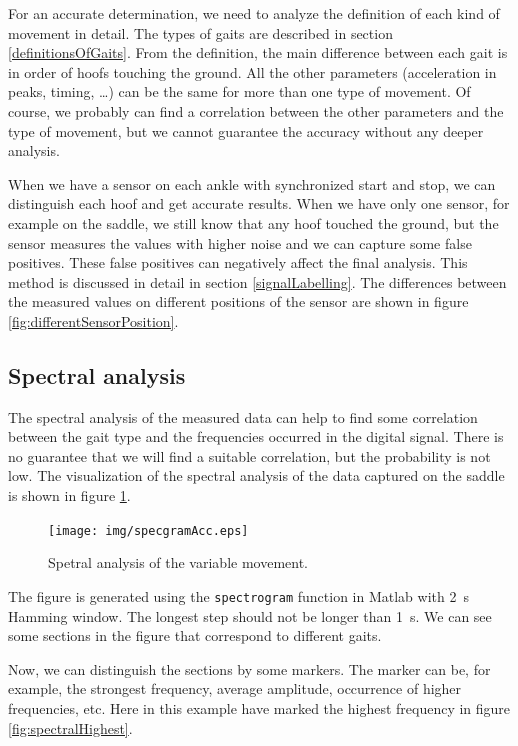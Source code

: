 For an accurate determination, we need to analyze the definition of each kind of movement in detail. The types of gaits are described in section \ref{definitionsOfGaits}. From the definition, the main difference between each gait is in order of hoofs touching the ground. All the other parameters (acceleration in peaks, timing, \dots) can be the same for more than one type of movement. Of course, we probably can find a correlation between the other parameters and the type of movement, but we cannot guarantee the accuracy without any deeper analysis.

When we have a sensor on each ankle with synchronized start and stop, we can distinguish each hoof and get accurate results. When we have only one sensor, for example on the saddle, we still know that any hoof touched the ground, but the sensor measures the values with higher noise and we can capture some false positives. These false positives can negatively affect the final analysis. This method is discussed in detail in section \ref{signalLabelling}. The differences between the measured values on different positions of the sensor are shown in figure \ref{fig:differentSensorPosition}.

\subsection{Spectral analysis}
\label{spectralAnalysis}
The spectral analysis of the measured data can help to find some correlation between the gait type and the frequencies occurred in the digital signal. There is no guarantee that we will find a suitable correlation, but the probability is not low. The visualization of the spectral analysis of the data captured on the saddle is shown in figure \ref{fig:spectralAnalysis}.

\begin{figure}
    \centering
    \label{fig:spectralAnalysis}
    \caption{Spetral analysis of the variable movement.}
    \texttt{[image: img/specgramAcc.eps]}
\end{figure}

The figure is generated using the \texttt{spectrogram} function in Matlab with \SI{2}{s} Hamming window. The longest step should not be longer than \SI{1}{s}. We can see some sections in the figure that correspond to different gaits.

Now, we can distinguish the sections by some markers. The marker can be, for example, the strongest frequency, average amplitude, occurrence of higher frequencies, etc. Here in this example have marked the highest frequency in figure \ref{fig:spectralHighest}.


